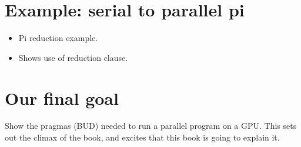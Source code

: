 \section{Example: serial to parallel pi}
\begin{itemize}
  \item Pi reduction example.
  \item Shows use of reduction clause.
\end{itemize}

\section{Our final goal}
Show the pragmas (BUD) needed to run a parallel program on a GPU.
This sets out the climax of the book, and excites that this book is going to explain it.
